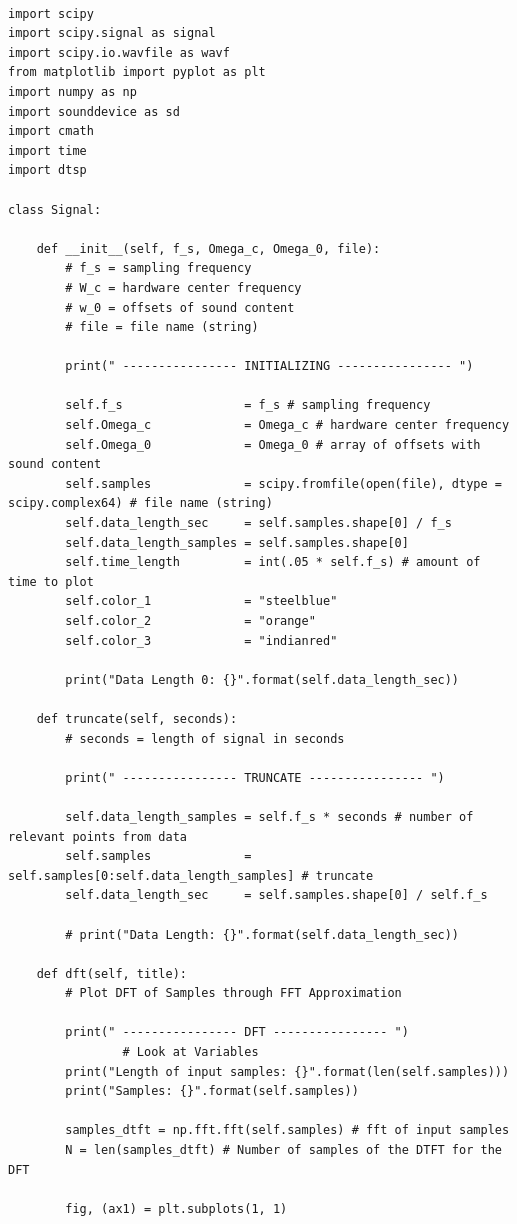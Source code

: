 \documentclass{article}
\begin{document}
\begin{lstlisting}

import scipy
import scipy.signal as signal
import scipy.io.wavfile as wavf
from matplotlib import pyplot as plt
import numpy as np
import sounddevice as sd
import cmath
import time
import dtsp

class Signal:

	def __init__(self, f_s, Omega_c, Omega_0, file):
		# f_s = sampling frequency
		# W_c = hardware center frequency
		# w_0 = offsets of sound content
		# file = file name (string)

		print(" ---------------- INITIALIZING ---------------- ")

		self.f_s                 = f_s # sampling frequency
		self.Omega_c             = Omega_c # hardware center frequency
		self.Omega_0             = Omega_0 # array of offsets with sound content
		self.samples             = scipy.fromfile(open(file), dtype = scipy.complex64) # file name (string)
		self.data_length_sec     = self.samples.shape[0] / f_s
		self.data_length_samples = self.samples.shape[0]
		self.time_length         = int(.05 * self.f_s) # amount of time to plot
		self.color_1             = "steelblue"
		self.color_2             = "orange"
		self.color_3			 = "indianred"

		print("Data Length 0: {}".format(self.data_length_sec))

	def truncate(self, seconds):
		# seconds = length of signal in seconds

		print(" ---------------- TRUNCATE ---------------- ")

		self.data_length_samples = self.f_s * seconds # number of relevant points from data
		self.samples             = self.samples[0:self.data_length_samples] # truncate
		self.data_length_sec     = self.samples.shape[0] / self.f_s

		# print("Data Length: {}".format(self.data_length_sec))

	def dft(self, title):
		# Plot DFT of Samples through FFT Approximation

		print(" ---------------- DFT ---------------- ")
				# Look at Variables
		print("Length of input samples: {}".format(len(self.samples)))
		print("Samples: {}".format(self.samples))

		samples_dtft = np.fft.fft(self.samples) # fft of input samples
		N = len(samples_dtft) # Number of samples of the DTFT for the DFT

		fig, (ax1) = plt.subplots(1, 1)


\end{lstlisting}
\end{document}
